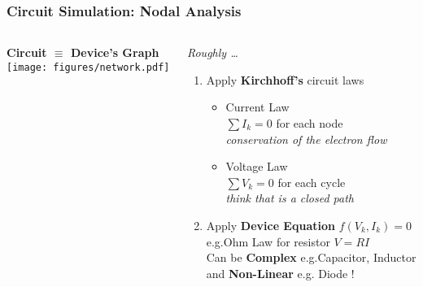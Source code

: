 
\begin{frame}
  \frametitle{Circuit Simulation: Nodal Analysis}
  \begin{columns}
    \begin{column}{.5\textwidth}
      \begin{center}
        \textbf{Circuit $\equiv$ Device's Graph} \\[1em]
        \texttt{[image: figures/network.pdf]}
      \end{center}
    \end{column}
    \begin{column}{.5\textwidth}
      \textit{Roughly \ldots} \\[.5em]
      \begin{enumerate}
      \item Apply \textbf{Kirchhoff's} circuit laws
        \begin{itemize}
        \item Current Law \\[.5em] %
          $\sum {I}_k = 0$ for each node \\[.5em]
          \textit{conservation of the electron flow} \\[.5em]
        \item Voltage Law \\[.5em] %
          $\sum {V}_k = 0$ for each cycle \\[.5em]
          \textit{think that is a closed path} \\[1em]
        \end{itemize}
      \item Apply \textbf{Device Equation} $f(V_k,I_k) = 0$ \\
        e.g.\@ Ohm Law for resistor $V = R I$ \\[.5em]
        Can be \textbf{Complex} e.g.\@ Capacitor, Inductor \\
        and \textbf{Non-Linear} e.g. Diode !
      \end{enumerate}
    \end{column}
  \end{columns}
\end{frame}

